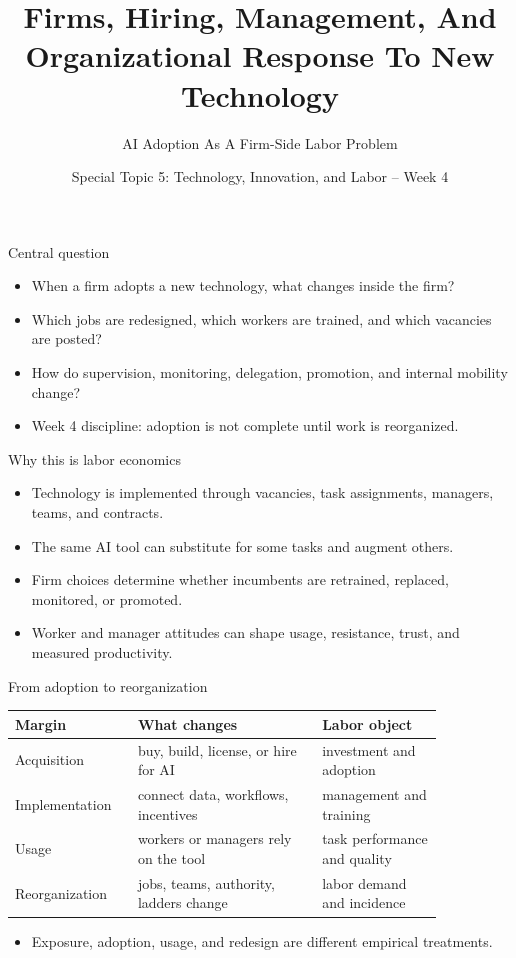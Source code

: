 \documentclass[aspectratio=169,11pt]{beamer}
\title{Firms, Hiring, Management, And Organizational Response To New Technology}
\subtitle{AI Adoption As A Firm-Side Labor Problem}
\author{Special Topic 5: Technology, Innovation, and Labor -- Week 4}
\date{}
\begin{document}
\begin{frame}
  \titlepage
\end{frame}

\begin{frame}{Central question}
\begin{itemize}
    \item When a firm adopts a new technology, what changes inside the firm?
    \item Which jobs are redesigned, which workers are trained, and which vacancies are posted?
    \item How do supervision, monitoring, delegation, promotion, and internal mobility change?
    \item Week 4 discipline: adoption is not complete until work is reorganized.
\end{itemize}
\end{frame}

\begin{frame}{Why this is labor economics}
\begin{itemize}
    \item Technology is implemented through vacancies, task assignments, managers, teams, and contracts.
    \item The same AI tool can substitute for some tasks and augment others.
    \item Firm choices determine whether incumbents are retrained, replaced, monitored, or promoted.
    \item Worker and manager attitudes can shape usage, resistance, trust, and measured productivity.
\end{itemize}
\end{frame}

\begin{frame}{From adoption to reorganization}
\small
\begin{tabular}{p{0.22\linewidth} p{0.38\linewidth} p{0.25\linewidth}}
\toprule
Margin & What changes & Labor object \\
\midrule
Acquisition & buy, build, license, or hire for AI & investment and adoption \\
Implementation & connect data, workflows, incentives & management and training \\
Usage & workers or managers rely on the tool & task performance and quality \\
Reorganization & jobs, teams, authority, ladders change & labor demand and incidence \\
\bottomrule
\end{tabular}
\vspace{0.35cm}
\begin{itemize}
    \item Exposure, adoption, usage, and redesign are different empirical treatments.
\end{itemize}
\end{frame}
\end{document}
